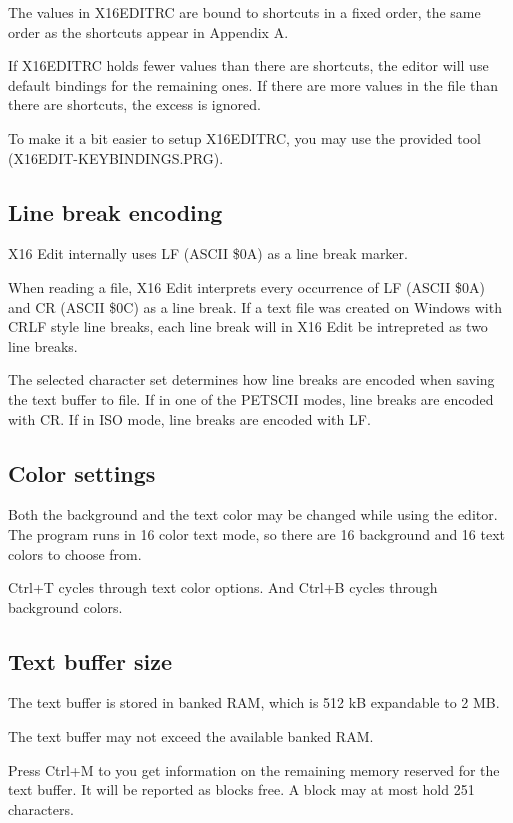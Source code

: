 \documentclass{article}
\begin{document}
        The values in X16EDITRC are bound to shortcuts in a fixed order, the same order as
        the shortcuts appear in Appendix A.
        
        If X16EDITRC holds fewer values than there are shortcuts, the editor will use
        default bindings for the remaining ones. If there are more values in the file than there
        are shortcuts, the excess is ignored.
        
        To make it a bit easier to setup X16EDITRC, you may use the provided tool
        (X16EDIT-KEYBINDINGS.PRG).

    \subsection{Line break encoding}
        X16 Edit internally uses LF (ASCII \$0A) as a line break marker.

        When reading a file, X16 Edit interprets every occurrence of LF (ASCII \$0A) and CR (ASCII \$0C) as
        a line break. If a text file was created on Windows with CRLF style line breaks, each line break
        will in X16 Edit be intrepreted as two line breaks.

        The selected character set determines how line breaks are encoded when saving the text buffer
        to file. If in one of the PETSCII modes, line breaks are encoded with CR. If in ISO mode, line
        breaks are encoded with LF.

    \subsection{Color settings}
        Both the background and the text color may be changed while using the editor. 
        The program runs in 16 color text mode, so there are 16 background and 16 text colors to choose from.

        Ctrl+T cycles through text color options.
        And Ctrl+B cycles through background colors.

    \subsection{Text buffer size}
        The text buffer is stored in banked RAM, which is 512 kB expandable to 2 MB.

        The text buffer may not exceed the available banked RAM.

        Press Ctrl+M to you get information on the remaining memory reserved for the
        text buffer. It will be reported as blocks free. A block may at most hold 251 characters.
\end{document}
